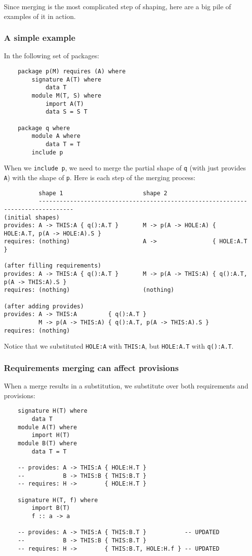 \documentclass{article}
\begin{document}
Since merging is the most complicated step of shaping, here are a big
pile of examples of it in action.

\subsubsection{A simple example}

In the following set of packages:

\begin{verbatim}
    package p(M) requires (A) where
        signature A(T) where
            data T
        module M(T, S) where
            import A(T)
            data S = S T

    package q where
        module A where
            data T = T
        include p
\end{verbatim}

When we \verb|include p|, we need to merge the partial shape
of \verb|q| (with just provides \verb|A|) with the shape
of \verb|p|.  Here is each step of the merging process:

\begin{verbatim}
          shape 1                       shape 2
          --------------------------------------------------------------------------------
(initial shapes)
provides: A -> THIS:A { q():A.T }       M -> p(A -> HOLE:A) { HOLE:A.T, p(A -> HOLE:A).S }
requires: (nothing)                     A ->                { HOLE:A.T }

(after filling requirements)
provides: A -> THIS:A { q():A.T }       M -> p(A -> THIS:A) { q():A.T, p(A -> THIS:A).S }
requires: (nothing)                     (nothing)

(after adding provides)
provides: A -> THIS:A         { q():A.T }
          M -> p(A -> THIS:A) { q():A.T, p(A -> THIS:A).S }
requires: (nothing)
\end{verbatim}

Notice that we substituted \verb|HOLE:A| with \verb|THIS:A|, but \verb|HOLE:A.T| with \verb|q():A.T|.

\subsubsection{Requirements merging can affect provisions}

When a merge results in a substitution, we substitute over both
requirements and provisions:

\begin{verbatim}
    signature H(T) where
        data T
    module A(T) where
        import H(T)
    module B(T) where
        data T = T

    -- provides: A -> THIS:A { HOLE:H.T }
    --           B -> THIS:B { THIS:B.T }
    -- requires: H ->        { HOLE:H.T }

    signature H(T, f) where
        import B(T)
        f :: a -> a

    -- provides: A -> THIS:A { THIS:B.T }           -- UPDATED
    --           B -> THIS:B { THIS:B.T }
    -- requires: H ->        { THIS:B.T, HOLE:H.f } -- UPDATED
\end{verbatim}
\end{document}
